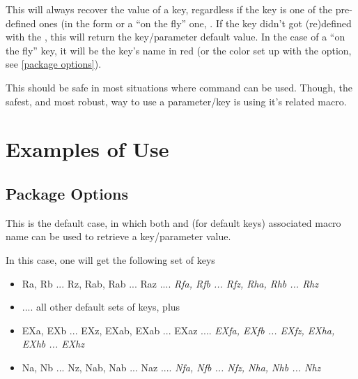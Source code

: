 \documentclass[10pt]{article}
\begin{document}
\begin{codedescribe}{\QuestVal}
\begin{codesyntax}%
\end{codesyntax}
This will always recover the value of a key, regardless if the key is one of the pre-defined ones (in the form  or a ``on the fly'' one, .
If the key didn't got (re)defined with the , this will return the key/parameter default value. In the case of a ``on the fly'' key, it will be the key's name in red (or the color set up with the  option, see \ref{package options}).

This should be safe in most situations where \tsobj{\pgfkeys} command can be used. Though, the safest, and most robust, way to use a parameter/key is using it's related macro.
\end{codedescribe}

\section{Examples of Use}

\subsection{Package Options}
\begin{codestore}
\usepackage{tikzquests}
\end{codestore}

This is the default case, in which both \tsobj{\QuestVal} and (for default keys) associated macro name can be used to retrieve a key/parameter value.

\begin{codestore}
\usepackage[xtrakeys={EX,N},xtraidx={f,h},undef color={blue},no defs]{tikzquests}
\end{codestore}


In this case, one will get the following set of keys

\begin{itemize}[nosep]
\item Ra, Rb ... Rz, Rab, Rab ... Raz .... \emph{Rfa, Rfb ... Rfz, Rha, Rhb ... Rhz}
\item .... all other default sets of keys, plus
\item EXa, EXb ... EXz, EXab, EXab ... EXaz .... \emph{EXfa, EXfb ... EXfz, EXha, EXhb ... EXhz}
\item Na, Nb ... Nz, Nab, Nab ... Naz .... \emph{Nfa, Nfb ... Nfz, Nha, Nhb ... Nhz}
\end{itemize}
\end{document}
